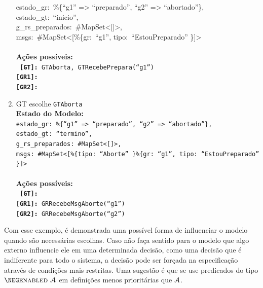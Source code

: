 \begin{enumerate}
{    estado\_gr:\ \%\{``g1'' =\textgreater{} ``preparado'', ``g2'' =\textgreater{}
    ``abortado''\},\\
    estado\_gt:\ ``inicio'',\\
    g\_rs\_preparados:\ \#MapSet\textless{}[]\textgreater{},\\
    msgs:\ \#MapSet\textless{}[\%\{gr:\ ``g1'', tipo:\ ``EstouPreparado'' \}]\textgreater{}\\\\}
  \textbf{Ações possíveis:}\\\texttt{
    \textbf{[GT]:}\ GTAborta, GTRecebePrepara(``g1'')\\
    \textbf{[GR1]:}\ \\
    \textbf{[GR2]:}\ \\}
\item GT escolhe \texttt{GTAborta}\\
  \textbf{Estado do Modelo:} \texttt{\small \\
    estado\_gr:\ \%\{``g1'' =\textgreater{} ``preparado'', ``g2'' =\textgreater{}
    ``abortado''\},\\
    estado\_gt:\ ``termino'',\\
    g\_rs\_preparados:\ \#MapSet\textless{}[]\textgreater{},\\
    msgs:\ \#MapSet\textless{}[\%\{tipo:\ ``Aborte'' \}\%\{gr:\ ``g1'', tipo:\
    ``EstouPreparado'' \}]\textgreater{}\\\\}
  \textbf{Ações possíveis:}\\\texttt{
    \textbf{[GT]:}\\
    \textbf{[GR1]:}\ GRRecebeMsgAborte(``g1'')\\
    \textbf{[GR2]:}\ GRRecebeMsgAborte(``g2'')}
\end{enumerate}

Com esse exemplo, é demonstrada uma possível forma de influenciar o modelo
quando são necessárias escolhas. Caso não faça sentido para o modelo que algo
externo influencie ele em uma determinada decisão, como uma decisão que é
indiferente para todo o sistema, a decisão pode ser forçada na especificação
através de condições mais restritas. Uma sugestão é que se use predicados do
tipo $\NEG\ENABLED\FANCYA$ em definições menos prioritárias que $\textbf{$\mathcal{A}$}$.
